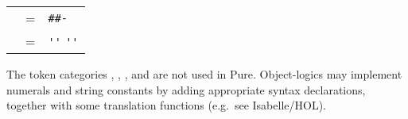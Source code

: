 \begin{isabellebody}
\begin{isamarkuptext}
\begin{center}
\begin{supertabular}{rcl}
    \hypertarget{syntax.inner.xnum-token}{\hyperlink{syntax.inner.xnum-token}{\mbox{}}} & = & \verb|#|\hyperlink{syntax.nat}{\mbox{}}\verb|#-|\hyperlink{syntax.nat}{\mbox{}} \\

    \hypertarget{syntax.inner.str-token}{\hyperlink{syntax.inner.str-token}{\mbox{}}} & = & \verb|''|  \verb|''| \\
  \end{supertabular}
  \end{center}

  The token categories \hyperlink{syntax.inner.num-token}{\mbox{}}, \hyperlink{syntax.inner.float-token}{\mbox{}}, \hyperlink{syntax.inner.xnum-token}{\mbox{}}, and \hyperlink{syntax.inner.str-token}{\mbox{}} are not used in Pure.  Object-logics may implement numerals
  and string constants by adding appropriate syntax declarations,
  together with some translation functions (e.g.\ see Isabelle/HOL).


\end{isamarkuptext}
\end{isabellebody}
